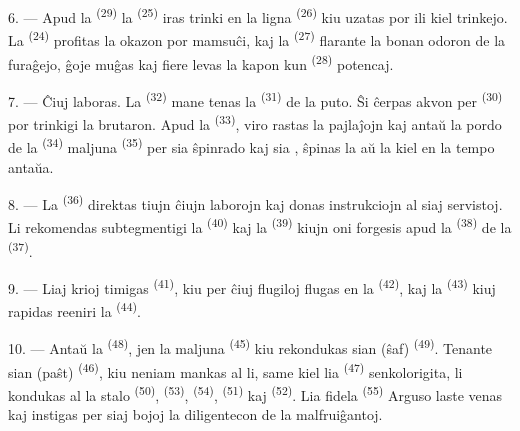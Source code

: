 6. --- Apud la  \textsuperscript{(29)} la 
\textsuperscript{(25)} iras trinki en la ligna 
\textsuperscript{(26)} kiu uzatas por ili kiel trinkejo. La 
\textsuperscript{(24)} profitas la okazon por mamsuĉi, kaj la 
\textsuperscript{(27)} flarante la bonan odoron de la furaĝejo, ĝoje muĝas kaj
fiere levas la kapon kun  \textsuperscript{(28)} potencaj.

7. --- Ĉiuj laboras. La  \textsuperscript{(32)} mane tenas
la  \textsuperscript{(31)} de la puto. Ŝi ĉerpas akvon per
 \textsuperscript{(30)} por trinkigi la brutaron. Apud la
 \textsuperscript{(33)}, viro rastas la pajlaĵojn kaj antaŭ la
pordo de la  \textsuperscript{(34)} maljuna 
\textsuperscript{(35)} per sia ŝpinrado kaj sia , ŝpinas la
 aŭ la  kiel en la tempo antaŭa.

\VUsaut{3.0mm}
\VUsaut{3.0mm}

8. --- La  \textsuperscript{(36)} direktas tiujn ĉiujn
laborojn kaj donas instrukciojn al siaj servistoj. Li rekomendas subtegmentigi
la  \textsuperscript{(40)} kaj la 
\textsuperscript{(39)} kiujn oni forgesis apud la 
\textsuperscript{(38)} de la  \textsuperscript{(37)}.

9. --- Liaj krioj timigas  \textsuperscript{(41)}, kiu per
ĉiuj flugiloj flugas en la  \textsuperscript{(42)}, kaj la
 \textsuperscript{(43)} kiuj rapidas reeniri la
 \textsuperscript{(44)}.

10. --- Antaŭ la  \textsuperscript{(48)}, jen la maljuna
 \textsuperscript{(45)} kiu rekondukas sian (ŝaf)
\textsuperscript{(49)}. Tenante sian (paŝt)
\textsuperscript{(46)}, kiu neniam mankas al li, same kiel lia 
\textsuperscript{(47)} senkolorigita, li kondukas al la stalo
 \textsuperscript{(50)}, 
\textsuperscript{(53)},  \textsuperscript{(54)},
 \textsuperscript{(51)} kaj 
\textsuperscript{(52)}. Lia fidela  \textsuperscript{(55)} Arguso
laste venas kaj instigas per siaj bojoj la diligentecon de la malfruiĝantoj.


